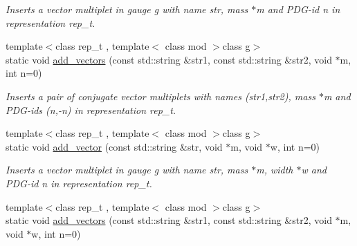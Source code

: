 \begin{DoxyCompactItemize}
\begin{DoxyCompactList}\small\item\em Inserts a vector multiplet in gauge g with name str, mass $\ast$m and P\+D\+G-\/id n in representation rep\+\_\+t. \end{DoxyCompactList}\item 
\hypertarget{a00372_a0bf317da6294eb702558bebb681d95d2}{}{\footnotesize template$<$class rep\+\_\+t , template$<$ class mod $>$class g$>$ }\\static void \hyperlink{a00372_a0bf317da6294eb702558bebb681d95d2}{add\+\_\+vectors} (const std\+::string \&str1, const std\+::string \&str2, void $\ast$m, int n=0)\label{a00372_a0bf317da6294eb702558bebb681d95d2}

\begin{DoxyCompactList}\small\item\em Inserts a pair of conjugate vector multiplets with names (str1,str2), mass $\ast$m and P\+D\+G-\/ids (n,-\/n) in representation rep\+\_\+t. \end{DoxyCompactList}\item 
\hypertarget{a00372_a13af59ef20dfa354e8603c32884fcfa4}{}{\footnotesize template$<$class rep\+\_\+t , template$<$ class mod $>$class g$>$ }\\static void \hyperlink{a00372_a13af59ef20dfa354e8603c32884fcfa4}{add\+\_\+vector} (const std\+::string \&str, void $\ast$m, void $\ast$w, int n=0)\label{a00372_a13af59ef20dfa354e8603c32884fcfa4}

\begin{DoxyCompactList}\small\item\em Inserts a vector multiplet in gauge g with name str, mass $\ast$m, width $\ast$w and P\+D\+G-\/id n in representation rep\+\_\+t. \end{DoxyCompactList}\item 
\hypertarget{a00372_a831d7e21cd47179d80ee5c56adf107d3}{}{\footnotesize template$<$class rep\+\_\+t , template$<$ class mod $>$class g$>$ }\\static void \hyperlink{a00372_a831d7e21cd47179d80ee5c56adf107d3}{add\+\_\+vectors} (const std\+::string \&str1, const std\+::string \&str2, void $\ast$m, void $\ast$w, int n=0)\label{a00372_a831d7e21cd47179d80ee5c56adf107d3}


\end{DoxyCompactItemize}
